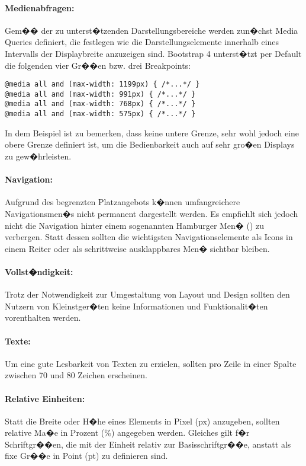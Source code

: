 \paragraph{Medienabfragen:} Gem�� der zu unterst�tzenden Darstellungsbereiche werden zun�chst Media Queries definiert, die festlegen wie die Darstellungselemente innerhalb eines Intervalls der Displaybreite anzuzeigen sind. Bootstrap 4 unterst�tzt per Default die folgenden vier Gr��en bzw. drei Breakpoints:
\begin{lstlisting} 
@media all and (max-width: 1199px) { /*...*/ } 
@media all and (max-width: 991px) { /*...*/ } 
@media all and (max-width: 768px) { /*...*/ } 
@media all and (max-width: 575px) { /*...*/ }
\end{lstlisting} 
In dem Beispiel ist zu bemerken, dass keine untere Grenze, sehr wohl jedoch eine obere Grenze definiert ist, um die Bedienbarkeit auch auf sehr gro�en Displays zu gew�hrleisten. 

\paragraph{Navigation:} Aufgrund des begrenzten Platzangebots k�nnen umfangreichere Navigationsmen�s nicht permanent dargestellt werden. Es empfiehlt sich jedoch nicht die Navigation hinter einem sogenannten Hamburger Men� (\faBars ) zu verbergen. Statt dessen sollten die wichtigsten Navigationselemente als Icons in einem Reiter oder als schrittweise ausklappbares Men� sichtbar bleiben. 

\paragraph{Vollst�ndigkeit:} Trotz der Notwendigkeit zur Umgestaltung von Layout und Design sollten den Nutzern von Kleinstger�ten keine Informationen und Funktionalit�ten vorenthalten werden.

\paragraph{Texte:} Um eine gute Lesbarkeit von Texten zu erzielen, sollten pro Zeile in einer Spalte zwischen 70 und 80 Zeichen erscheinen. 

\paragraph{Relative Einheiten:} Statt die Breite oder H�he eines Elements in Pixel (px) anzugeben, sollten relative Ma�e in Prozent (\%) angegeben werden. Gleiches gilt f�r Schriftgr��en, die mit der Einheit  relativ zur Basisschriftgr��e, anstatt als fixe Gr��e in Point (pt) zu definieren sind.

